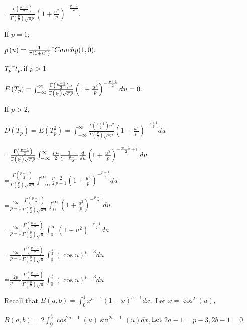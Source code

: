\documentclass{article}
\begin{document}
=$\frac{\Gamma \left( \frac{p+1}{2}\right) }{\Gamma \left( \frac{p}{2}%
\right) \sqrt{\pi p}}\left( 1+\frac{u^{2}}{p}\right) ^{-\frac{p+1}{2}}.$

If $p=1;$

$p\left( u\right) =\frac{1}{\pi \left( 1+u^{2}\right) }\symbol{126}%
Cauchy(1,0).$

$T_{p}\symbol{126}t_{p},$if $p>1$

$E\left( T_{p}\right) =\int_{-\infty }^{\infty }\frac{\Gamma \left( \frac{p+1%
}{2}\right) u}{\Gamma \left( \frac{p}{2}\right) \sqrt{\pi p}}\left( 1+\frac{%
u^{2}}{p}\right) ^{-\frac{p+1}{2}}du=0.$

If $p>2,$

$D\left( T_{p}\right) =E\left( T_{p}^{2}\right) =\int_{-\infty }^{\infty }%
\frac{\Gamma \left( \frac{p+1}{2}\right) u^{2}}{\Gamma \left( \frac{p}{2}%
\right) \sqrt{\pi p}}\left( 1+\frac{u^{2}}{p}\right) ^{-\frac{p+1}{2}}du$

=$\frac{\Gamma \left( \frac{p+1}{2}\right) }{\Gamma \left( \frac{p}{2}%
\right) \sqrt{\pi p}}\int_{-\infty }^{\infty }\frac{pu}{2}\frac{1}{1-\frac{%
p+1}{2}}\frac{d}{du}\left( 1+\frac{u^{2}}{p}\right) ^{-\frac{p+1}{2}+1}du$

=$\frac{\Gamma \left( \frac{p+1}{2}\right) }{\Gamma \left( \frac{p}{2}%
\right) \sqrt{\pi p}}\int_{-\infty }^{\infty }\frac{p}{2}\frac{2}{p-1}\left(
1+\frac{u^{2}}{p}\right) ^{-\frac{p-1}{2}}du$

=$\frac{2p}{p-1}\frac{\Gamma \left( \frac{p+1}{2}\right) }{\Gamma \left( 
\frac{p}{2}\right) \sqrt{\pi p}}\int_{0}^{\infty }\left( 1+\frac{u^{2}}{p}%
\right) ^{-\frac{p-1}{2}}du$

=$\frac{2p}{p-1}\frac{\Gamma \left( \frac{p+1}{2}\right) }{\Gamma \left( 
\frac{p}{2}\right) \sqrt{\pi }}\int_{0}^{\infty }\left( 1+u^{2}\right) ^{-%
\frac{p-1}{2}}du$

=$\frac{2p}{p-1}\frac{\Gamma \left( \frac{p+1}{2}\right) }{\Gamma \left( 
\frac{p}{2}\right) \sqrt{\pi }}\int_{0}^{\frac{\pi }{2}}\left( \cos u\right)
^{p-3}du$

=$\frac{2p}{p-1}\frac{\Gamma \left( \frac{p+1}{2}\right) }{\Gamma \left( 
\frac{p}{2}\right) \sqrt{\pi }}\int_{0}^{\frac{\pi }{2}}\left( \cos u\right)
^{p-3}du$

Recall that $B\left( a,b\right) =\int_{0}^{1}x^{a-1}\left( 1-x\right)
^{b-1}dx,$ Let $x=\cos ^{2}\left( u\right) ,$

$B\left( a,b\right) =2\int_{0}^{\frac{\pi }{2}}\cos ^{2a-1}\left( u\right)
\sin ^{2b-1}\left( u\right) dx,$Let $2a-1=p-3,2b-1=0$
\end{document}
